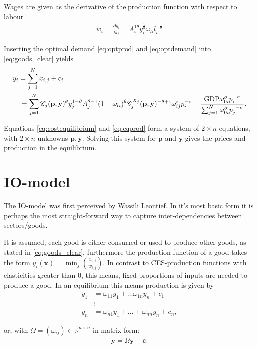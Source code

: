 \documentclass{article}
\newcommand{\costf}[1]{\mathscr{C}_#1}
\newcommand{\cfx}[1]{\mathscr{C}_#1^{X_#1}}
\begin{document}
Wages are given as the derivative of the production function with respect to labour 
\begin{align*}
    w_i = \frac{\partial y_i}{\partial l_i} = A_i^{1 \theta} y_i^{\frac 1 \theta} \omega_{li} l_i^{- \frac 1 \theta}
\end{align*}

Inserting the optimal demand \eqref{eq:optprod} and \eqref{eq:optdemand} into \eqref{eq:goods_clear} yields 
\begin{align}
  & y_i = \sum_{j=1}^N x_{i,j} + c_i \notag \\
  & \quad =  \sum_{j=1}^N \costf{j}(\mathbf p,\mathbf y)^\theta y_j^{1-\theta} A_j^{\theta - 1} (1-\omega_{li})^\theta \cfx{j}(\mathbf p,\mathbf y)^{-\theta + \varepsilon}  \omega_{ij}^{ \varepsilon} p_{i}^{- \varepsilon}  +  \frac {\text{GDP} \omega_{0i}^{\sigma} p_i^{-\sigma}}{\sum_{j=1}^N \omega_{0i}^\sigma p_j^{1- \sigma}}.
  \label{eq:eqprod}
\end{align}

Equations \eqref{eq:costequilibrium} and \eqref{eq:eqprod} form a system of $2 \times n$ equations, with $2 \times n$ unknowns $\mathbf p, \mathbf y$. 
Solving this system for $\mathbf p$ and $\mathbf y$ gives the prices and production in the equilibrium.
    
\section{IO-model}

The IO-model was first perceived by Wassili Leontief. In it's most basic form it is perhaps the most straight-forward way to capture inter-dependencies between sectors/goods. 

It is assumed, each good is either consumed or used to produce other goods, as stated in \eqref{eq:goods_clear}, furthermore the production function of a good takes the form $y_i(\mathbf x) = \min_{j}(\frac{x_{i,j}}{w_{i,j}})$. 
In contrast to CES-production functions with elasticities greater than $0$, this means, fixed proportions of inputs are needed to produce a good. 
In an equilibrium this means production is given by %
\begin{align*}
  y_1 &= \omega_{11} y_1 + \dots \omega_{1n} y_n + c_1  \\ 
      &\vdots \\ 
  y_n &= \omega_{n1} y_1 + \dots + \omega_{nn} y_n + c_n,
\end{align*}

or, with $\Omega = (\omega_{ij}) \in \mathbb R^{n\times n}$ in matrix form:
\begin{align}
  \mathbf y = \Omega \mathbf y + \mathbf c.
\end{align}
\end{document}
